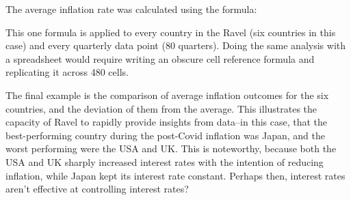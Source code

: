 The average inflation rate was calculated using the formula:


This one formula is applied to every country in the Ravel (six countries
in this case) and every quarterly data point (80 quarters). Doing
the same analysis with a spreadsheet would require writing an obscure
cell reference formula and replicating it across 480 cells.

The final example is the comparison of average inflation outcomes
for the six countries, and the deviation of them from the average.
This illustrates the capacity of Ravel to rapidly provide insights
from data--in this case, that the best-performing country during
the post-Covid inflation was Japan, and the worst performing were
the USA and UK. This is noteworthy, because both the USA and UK sharply
increased interest rates with the intention of reducing inflation,
while Japan kept its interest rate constant. Perhaps then, interest
rates aren't effective at controlling interest rates? 
\begin{center}
\par\end{center}

